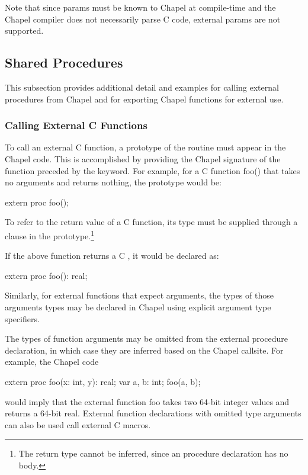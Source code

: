 \begin{craychapel}
Note that since params must be known to Chapel at compile-time and
the Chapel compiler does not necessarily parse C code,
external params are not supported.
\end{craychapel}

\subsection{Shared Procedures}
\label{Shared_Procedures}

This subsection provides additional detail and examples for calling external
procedures from Chapel and for exporting Chapel functions for external use.

\subsubsection{Calling External C Functions}
\label{Calling_External_C_Functions}

To call an external C function, a prototype of
the routine must appear in the Chapel code.  This is accomplished by providing
the Chapel signature of the function preceded by the  keyword.  For
example, for a C function foo() that takes no arguments and returns
nothing, the prototype would be:
\begin{chapel}
       extern proc foo();
\end{chapel}

To refer to the return value of a C function, its type must be supplied through
a  clause in the prototype.\footnote{The return type cannot be
inferred, since an  procedure declaration has no body.}

If the above function returns a C , it would be declared as:
\begin{chapel}
       extern proc foo(): real;
\end{chapel}
Similarly, for external functions that expect arguments, the types of those
arguments types may be declared in Chapel using explicit argument type specifiers.

The types of function arguments may be omitted from the external procedure
declaration, in which case they are inferred based on the Chapel callsite.
For example, the Chapel code
\begin{chapel}
       extern proc foo(x: int, y): real;
       var a, b: int;
       foo(a, b);
\end{chapel}
\noindent
would imply that the external function foo takes two 64-bit integer values
and returns a 64-bit real.  External function declarations with omitted type
arguments can also be used call external C macros.

